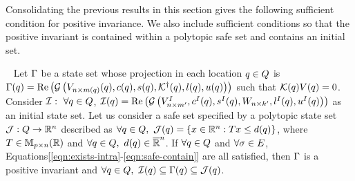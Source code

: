 Consolidating the previous results in this section gives the following
sufficient condition for positive invariance.  We also
include sufficient conditions so that the positive invariant is
contained within a polytopic safe set and contains an initial set.

\begin{theorem}~\label{thm:main} Let $\Gamma$ be a state set whose
  projection in each location $q\in Q$ is
  $\Gamma(q) = \operatorname{\operatorname{Re}}\left(\mathcal{G}\left(V_{n\times
      m(q)}(q),c(q),s(q),\mathcal{K}^\dagger(q),l(q),u(q)\right)\right)$
  such that $\mathcal{K}(q)V(q) = 0$.  Consider
  $\mathcal{I}:~\forall q\in Q$,
  $\mathcal{I}(q)=\operatorname{\operatorname{Re}}\left(\mathcal{G}\left(V^I_{n\times m^\prime
    },c^I(q),s^I(q),W_{n\times
      k^\prime},l^I(q),u^I(q)\right)\right)$ as an initial state set.  Let
  us consider a safe set specified by a polytopic state set
  $\mathcal{J}:Q\rightarrow\mathbb{R}^n$ described as $\forall
  q\in Q,~\mathcal{J}(q)=\left\{x\in\mathbb{R}^n:Tx\leq
  d(q)\right\}$, where $T\in\mathbb{M}_{p\times n}(\mathbb{R})$ and
  $\forall q\in Q,~d(q)\in\mathbb{\overline{R}}^n$.  If $\forall
  q\in Q$ and $\forall \sigma\in E$,
  Equations[\ref{eqn:exists-intra}-\ref{eqn:safe-contain}] are all
  satisfied, then $\Gamma$ is a positive invariant and $\forall
  q\in Q,~\mathcal{I}(q)\subseteq\Gamma(q)\subseteq
  \mathcal{J}(q)$.
\end{theorem}